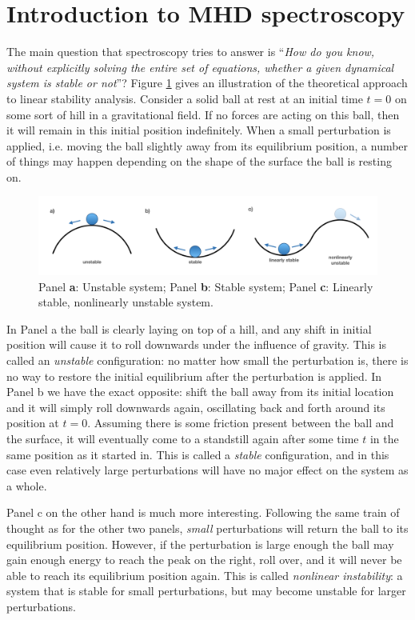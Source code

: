 \section{Introduction to MHD spectroscopy}
The main question that spectroscopy tries to answer is ``\emph{How do you know, without explicitly solving the entire set of equations, whether a given dynamical system is stable or not}''? Figure \ref{fig: stability} gives an illustration of the theoretical approach to linear stability analysis. Consider a solid ball at rest at an initial time $t = 0$ on some sort of hill in a gravitational field. If no forces are acting on this ball, then it will remain in this initial position indefinitely. When a small perturbation is applied, i.e. moving the ball slightly away from its equilibrium position, a number of things may happen depending on the shape of the surface the ball is resting on.

\begin{figure}[b]
  \centering
  \includegraphics[width=\textwidth]{stability.png}
  \caption{Panel \textbf{a}: Unstable system; Panel \textbf{b}: Stable system; Panel \textbf{c}: Linearly stable, nonlinearly unstable system.}
  \label{fig: stability}
\end{figure}

In Panel a the ball is clearly laying on top of a hill, and any shift in initial position will cause it to roll downwards under the influence of gravity. This is called an \emph{unstable} configuration: no matter how small the perturbation is, there is no way to restore the initial equilibrium after the perturbation is applied.
In Panel b we have the exact opposite: shift the ball away from its initial location and it will simply roll downwards again, oscillating back and forth around its position at $t = 0$. Assuming there is some friction present between the ball and the surface, it will eventually come to a standstill again after some time $t$ in the same position as it started in. This is called a \emph{stable} configuration, and in this case even relatively large perturbations will have no major effect on the system as a whole.

Panel c on the other hand is much more interesting. Following the same train of thought as for the other two panels, \emph{small} perturbations will return the ball to its equilibrium position. However, if the perturbation is large enough the ball may gain enough energy to reach the peak on the right, roll over, and it will never be able to reach its equilibrium position again. This is called \emph{nonlinear instability}: a system that is stable for small perturbations, but may become unstable for larger perturbations.

